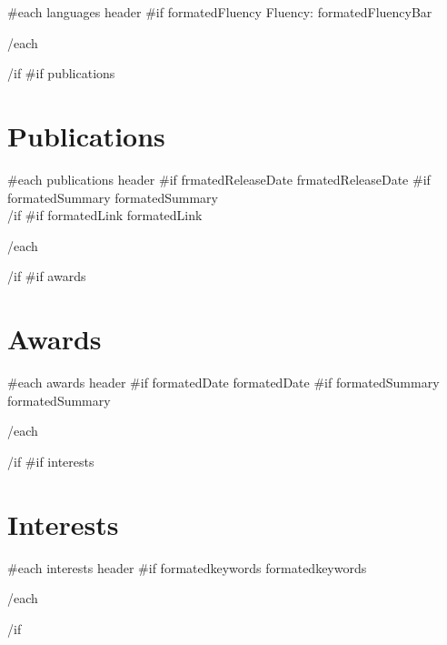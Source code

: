 \documentclass{article}
\begin{document}
\begin{paracol}{2}
\begin{leftcolumn*}
{  {{#each languages}}
    {{ header }}\newline
    {{#if formatedFluency}} Fluency: {{ formatedFluencyBar }}
    \par
  {{/each}}
}{{/if}}
{{#if publications}}\section*{Publications}{
  {{#each publications}}
    {{ header }}\newline
    {{#if frmatedReleaseDate}}{{ frmatedReleaseDate }}
    {{#if formatedSummary}}
      {{ formatedSummary }}
      \\
    {{/if}}
    {{#if formatedLink}}{{ formatedLink }}
    \par
  {{/each}}
}{{/if}}
{{#if awards}}\section*{Awards}{
  {{#each awards}}
    {{ header }}\newline
    {{#if formatedDate}}{{ formatedDate }}
    {{#if formatedSummary}}{{ formatedSummary }}
    \par
  {{/each}}
}{{/if}}
{{#if interests}}\section*{Interests}{
  {{#each interests}}
    {{ header }}\newline
    {{#if formatedkeywords}}{{ formatedkeywords }}
    \par
  {{/each}}
}{{/if}}

\end{leftcolumn*}


\end{paracol}
\end{document}
